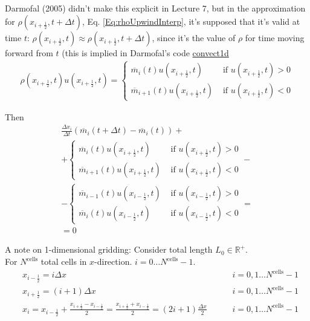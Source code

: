 \documentclass[10pt]{amsart}
\begin{document}
\begin{multicols*}{2}
Darmofal (2005) \cite{Darm2005} didn't make this explicit in Lecture 7, but in the approximation for  $\rho(x_{i+\frac{1}{2} },t+\Delta t)$, Eq. \ref{Eq:rhoUpwindInterp}, it's supposed that it's valid at time $t$: $\rho(x_{i+\frac{1}{2} },t) \approx  \rho(x_{i+\frac{1}{2} },t+\Delta t)$, since it's the value of $\rho$ for time moving forward from $t$ (this is implied in Darmofal's code \href{http://ocw.mit.edu/courses/aeronautics-and-astronautics/16-901-computational-methods-in-aerospace-engineering-spring-2005/lecture-notes/convect1d.m}{convect1d}
\[
\begin{gathered}
  \rho(x_{i+\frac{1}{2} },t)u(x_{i+\frac{1}{2} },t) = \begin{cases} \overline{m}_i(t)u(x_{i+\frac{1}{2} },t) & \text{ if } u(x_{i+\frac{1}{2}},t )>0 \\
    \overline{m}_{i+1}(t)u(x_{i+\frac{1}{2} },t) & \text{ if } u(x_{i+\frac{1}{2}},t )<0
    \end{cases}
  \end{gathered}
\]

Then
\begin{equation}
\begin{gathered}
\frac{ \Delta x_i }{ \Delta t}( \overline{m}_i(t+\Delta t) - \overline{m}_i(t) ) + \\
+ \begin{cases} \overline{m}_i(t)u(x_{i+\frac{1}{2} },t) & \text{ if } u(x_{i+\frac{1}{2}},t )>0 \\
    \overline{m}_{i+1}(t)u(x_{i+\frac{1}{2} },t) & \text{ if } u(x_{i+\frac{1}{2}},t )<0
\end{cases} - \\
- \begin{cases} \overline{m}_{i-1}(t)u(x_{i-\frac{1}{2} },t) & \text{ if } u(x_{i-\frac{1}{2}},t )>0 \\
    \overline{m}_{i}(t)u(x_{i-\frac{1}{2} },t) & \text{ if } u(x_{i-\frac{1}{2}},t )<0
\end{cases} = \\
= 0
  \end{gathered}
  \end{equation}

A note on 1-dimensional gridding: Consider total length $L_0 \in \mathbb{R}^+$.  \\
For $N^{\text{cells}}$ total cells in $x$-direction.  $i=0\dots N^{\text{cells}}-1$.
\[
\begin{aligned}
  & x_{i-\frac{1}{2}} = i \Delta x \qquad \, & i = 0, 1 \dots N^{\text{cells}} - 1 \\ 
  & x_{i+\frac{1}{2}} = (i+1) \Delta x \qquad \, & i = 0, 1 \dots N^{\text{cells}} - 1 \\ 
  & x_i = x_{i-\frac{1}{2} } + \frac{ x_{i+\frac{1}{2}} - x_{i-\frac{1}{2} } }{2} = \frac{ x_{i + \frac{1}{2} } + x_{i-\frac{1}{2} } }{2} = (2 i + 1)\frac{  \Delta x }{2} \qquad \, & i = 0, 1 \dots N^{\text{cells}} - 1 \\ 
\end{aligned}
\]




\end{multicols*}
\end{document}
